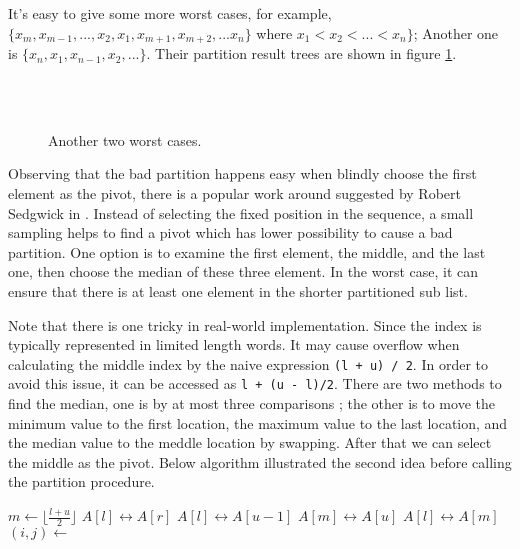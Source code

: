 \documentclass{article}
\begin{document}
It's easy to give some more worst cases, for example, $\{ x_m, x_{m-1}, ..., x_2, x_1, x_{m+1}, x_{m+2}, ... x_n\}$
where $x_1 < x_2 < ... < x_n \}$; 
Another one is $\{x_n, x_1, x_{n-1}, x_2, ... \}$. Their partition result trees are shown
in figure \ref{fig:worst-cases-2}.

\begin{figure}[htbp]
   \centering
    \\
    \\
   \caption{Another two worst cases.} 
   \label{fig:worst-cases-2}
\end{figure}

Observing that the bad partition happens easy when blindly choose the first element as the pivot, 
there is a popular work around suggested by Robert Sedgwick in \cite{qsort-impl}. Instead of
selecting the fixed position in the sequence, a small sampling helps to find a pivot which
has lower possibility to cause a bad partition. One option is to examine the first element, the
middle, and the last one, then choose the median of these three element. In the worst case,
it can ensure that there is at least one element in the shorter partitioned sub list.

Note that there is one tricky in real-world implementation. Since the index is typically represented
in limited length words. It may cause overflow when calculating the middle index by 
the naive expression \verb|(l + u) / 2|. In order to avoid this issue, it can be accessed
as \verb|l + (u - l)/2|. There are two methods to find the median, one is by at most three
comparisons \cite{3-way-part}; the other is to move the minimum value to the first location, the maximum value
to the last location, and the median value to the meddle location by swapping. After that
we can select the middle as the pivot.
Below algorithm illustrated the second idea before calling the partition procedure.

\begin{algorithmic}
    \State $m \gets \lfloor \frac{l + u}{2} \rfloor$ 
     
      \State {} $A[l] \leftrightarrow A[r]$
    \EndIf
     
      \State {} $A[l] \leftrightarrow A[u-1]$
    \EndIf
     
      \State {} $A[m] \leftrightarrow A[u]$
    \EndIf
    \State {} $A[l] \leftrightarrow A[m]$
    \State $(i, j) \gets $ 
    \State {}
    \State {}
  \EndIf
\EndProcedure
\end{algorithmic}
\end{document}
